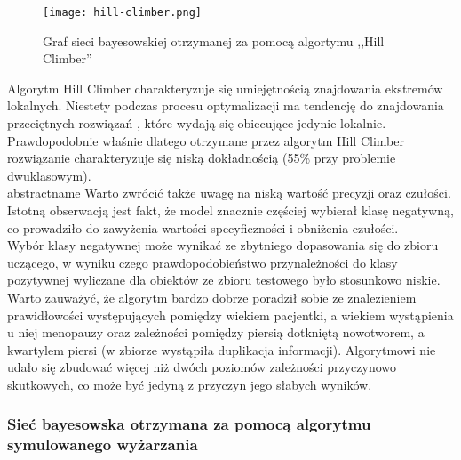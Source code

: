 \begin{figure}[H]
	\centering
	\texttt{[image: hill-climber.png]}
	\label{hc}
	\caption{Graf sieci bayesowskiej otrzymanej za pomocą algortymu ,,Hill Climber''}
\end{figure}

Algorytm Hill Climber charakteryzuje się umiejętnością znajdowania ekstremów lokalnych. Niestety podczas procesu optymalizacji ma tendencję do znajdowania przeciętnych rozwiązań , które wydają się obiecujące jedynie lokalnie. Prawdopodobnie właśnie dlatego otrzymane przez algorytm Hill Climber rozwiązanie charakteryzuje się niską dokładnością (55\% przy problemie dwuklasowym).\\abstractname{}  Warto zwrócić także uwagę na niską wartość precyzji oraz czułości. Istotną obserwacją jest fakt, że model znacznie częściej wybierał klasę negatywną, co prowadziło do zawyżenia wartości specyficzności i obniżenia czułości. \\
Wybór klasy negatywnej może wynikać ze zbytniego dopasowania się do zbioru uczącego, w wyniku czego prawdopodobieństwo przynależności do klasy pozytywnej wyliczane dla obiektów ze zbioru testowego było stosunkowo niskie.\\
Warto zauważyć, że algorytm bardzo dobrze poradził sobie ze znalezieniem prawidłowości występujących pomiędzy wiekiem pacjentki, a wiekiem wystąpienia u niej menopauzy oraz zależności pomiędzy piersią dotkniętą nowotworem, a kwartylem piersi (w zbiorze wystąpiła duplikacja informacji). Algorytmowi nie udało się zbudować więcej niż dwóch poziomów zależności przyczynowo skutkowych, co może być jedyną z przyczyn jego słabych wyników.

\subsubsection{Sieć bayesowska otrzymana za pomocą algorytmu symulowanego wyżarzania}

